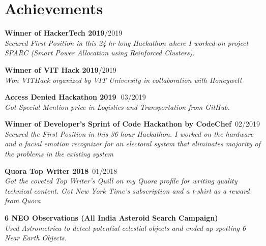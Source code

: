 \documentclass[a4paper, 12pt]{article}
\begin{document}
	\section*{Achievements}
	\begin{flushleft}
		\textbf{Winner of HackerTech 2019}\qquad\qquad\qquad\qquad\qquad\qquad\qquad\qquad\qquad\qquad\quad\quad\qquad{}/2019\\\textit{Secured First Position in this 24 hr long Hackathon where I worked on project\\SPARC (Smart Power Allocation using Reinforced Clusters).}
	\end{flushleft}
	
	\begin{flushleft}
		\textbf{Winner of VIT Hack 2019}\qquad\qquad\qquad\qquad\qquad\qquad\qquad\qquad\qquad\qquad\qquad\quad\qquad{}/2019\\\textit{Won VITHack organized by VIT University in collaboration with Honeywell}
	\end{flushleft}
	
	\begin{flushleft}
		\textbf{Access Denied Hackathon 2019}\qquad\qquad\qquad\qquad\qquad\qquad\qquad\qquad\qquad\qquad\qquad\quad\quad\,\, 03/2019\\\textit{Got Special Mention price in Logistics and Transportation from GitHub.}
	\end{flushleft}

    \begin{flushleft}
        \textbf{Winner of Developer's Sprint of Code Hackathon by CodeChef}\qquad\qquad\qquad\qquad\, 02/2019\\\textit{Secured the First Position in this 36 hour Hackathon. I worked on the hardware and a facial emotion recognizer for an electoral system that eliminates majority of the problems in the existing system}
    \end{flushleft}
    
    \begin{flushleft}
        \textbf{Quora Top Writer 2018}\qquad\qquad\qquad\qquad\qquad\qquad\qquad\qquad\qquad\qquad\qquad\qquad\qquad\qquad\, 01/2018\\\textit{Got the coveted Top Writer's Quill on my Quora profile for writing quality technical content. Got New York Time's subscription and a t-shirt as a reward from Quora}
    \end{flushleft}
    
    \begin{flushleft}
        \textbf{6 NEO Observations (All India Asteroid Search Campaign)}\qquad\qquad\qquad\qquad\qquad{}\\\textit{Used Astrometrica to detect potential celestial objects and ended up spotting 6 Near Earth Objects.}
    \end{flushleft}
    
\end{document}
